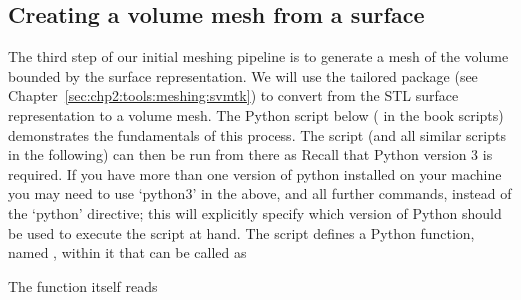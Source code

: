 \subsection{Creating a volume mesh from a surface}
\label{subsec:chp3:mesh-creation}

%
%
The third step of our initial meshing pipeline is to generate a mesh
of the volume bounded by the surface representation. We will use the
tailored package \svmtk{} (see
Chapter~\ref{sec:chp2:tools:meshing:svmtk}) to convert from the STL
surface representation to a volume mesh. The Python script below (
 in the book scripts)
demonstrates the fundamentals of this process. The script (and all
similar scripts in the following) can then be run from there as
Recall that Python version 3 is required.  If you have more than one version 
of python installed on your machine you may need to use `python3' in the 
above, and all further commands, instead of the `python' directive; this will 
explicitly specify which version of Python should be used to execute the 
script at hand.  %
%
The script  defines a Python function, 
named , within it that can be called as

\noindent The function itself reads

